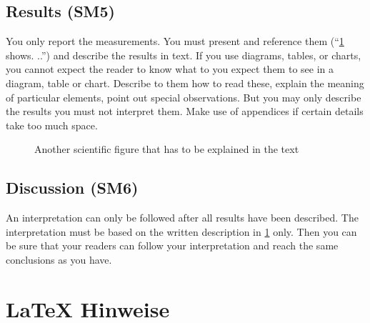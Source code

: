\documentclass[
  numbers=autoendperiod,
  ngerman,  %
  a4paper,  %
  twoside,  %
  bibliography=totoc,
  headsepline,
  cleardoublepage=empty,
  parskip=half,
  draft=false
]{scrbook}
\theoremstyle{break}
\begin{document}
\section{Results (SM5)}\label{sec:evaluation:results}

You only report the measurements.
You must present and reference them (``\cref{fig:my_label2} shows.
..'') and describe the results in text.
If you use diagrams, tables, or charts, you cannot expect the reader to know what to you expect them to see in a diagram, table or chart.
Describe to them how to read these, explain the meaning of particular elements, point out special observations.
But you may only describe the results you must not interpret them.
Make use of appendices if certain details take too much space.

\begin{figure}
  \centering
  \caption{Another scientific figure that has to be explained in the text}
  \label{fig:my_label2}
\end{figure}

\section{Discussion (SM6)}\label{sec:evaluation:discussion}

An interpretation can only be followed after all results have been described.
The interpretation must be based on the written description in \cref{sec:evaluation:results} only.
Then you can be sure that your readers can follow your interpretation and reach the same conclusions as you have.


\chapter{LaTeX Hinweise}
\label{sec:latexhints}

\newcount\LTGbeginlineexample
\newcount\LTGendlineexample
\newenvironment{ltgexample}%
{\LTGbeginlineexample=\numexpr\inputlineno+1\relax}%
{\LTGendlineexample=\numexpr\inputlineno-1\relax%
  \tcbinputlisting{%
    listing only,
    listing file=\currfilepath,
    colback=green!5!white,
    colframe=green!25,
    coltitle=black!90,
    coltext=black!90,
    left=8mm,
    title=Zugehöriger \LaTeX{}-Quelltext aus \texttt{\currfilepath},
    listing options={
        frame=none,
        language={[LaTeX]TeX},
        escapeinside={},
        firstline=\the\LTGbeginlineexample,
        lastline=\the\LTGendlineexample,
        firstnumber=\the\LTGbeginlineexample,
        basewidth=.5em,
        aboveskip=0mm,
        belowskip=0mm,
        numbers=left,
        xleftmargin=0mm,
        numberstyle=\tiny,
        numbersep=8pt%
      }
  }
}%
\end{document}

